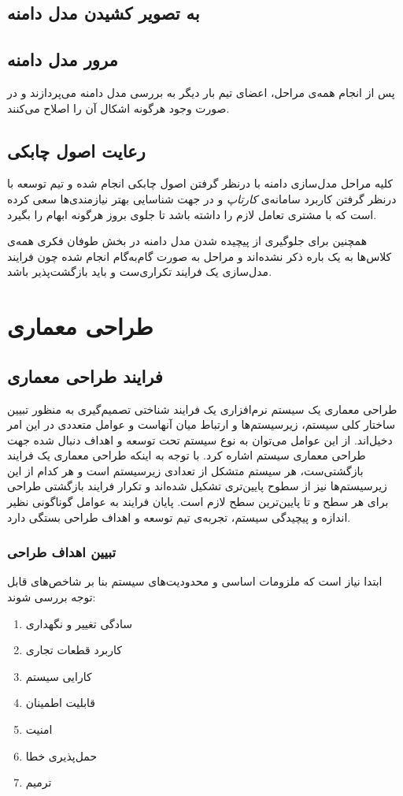 \section{به تصویر کشیدن مدل دامنه}


\section{مرور مدل دامنه}
پس از انجام همه‌ی مراحل، اعضای تیم بار دیگر به بررسی مدل دامنه می‌پردازند و در صورت وجود هرگونه اشکال آن را اصلاح می‌کنند.

\section{رعایت اصول چابکی}
کلیه مراحل مدل‌سازی دامنه با درنظر گرفتن اصول چابکی انجام شده و تیم توسعه با درنظر گرفتن کاربرد سامانه‌ی \textit{کارتاپ} و در جهت شناسایی بهتر نیازمندی‌ها سعی کرده است که با مشتری تعامل لازم را داشته باشد تا جلوی بروز هرگونه ابهام را بگیرد.

همچنین برای جلوگیری از پیچیده‌ شدن مدل دامنه در بخش طوفان فکری همه‌ی کلاس‌ها به یک باره ذکر نشده‌اند و مراحل به صورت گام‌به‌گام انجام شده چون فرایند مدل‌سازی یک فرایند تکراری‌ست و باید بازگشت‌پذیر باشد.

\chapter{طراحی معماری}

\section{فرایند طراحی معماری}	
طراحی معماری یک سیستم نرم‌افزاری یک فرایند شناختی تصمیم‌گیری به منظور تبیین ساختار کلی سیستم، زیرسیستم‌ها و ارتباط میان آنهاست و عوامل متعددی در این امر دخیل‌اند. از این عوامل می‌توان به نوع سیستم تحت توسعه و اهداف دنبال شده جهت طراحی معماری سیستم اشاره کرد. با توجه به اینکه طراحی معماری یک فرایند بازگشتی‌ست، هر سیستم متشکل از تعدادی زیرسیستم است و هر کدام از این زیرسیستم‌ها نیز از سطوح پایین‌تری تشکیل شده‌اند و تکرار فرایند بازگشتی طراحی برای هر سطح و تا پایین‌ترین سطح لازم است. پایان فرایند به عوامل گوناگونی نظیر اندازه و پیچیدگی سیستم، تجربه‌ی تیم توسعه و اهداف طراحی بستگی دارد.

\subsection{تبیین اهداف طراحی}			
ابتدا نیاز است که ملزومات اساسی و محدودیت‌های سیستم بنا بر شاخص‌های قابل توجه بررسی شوند:
\begin{enumerate}
	\item
	سادگی تغییر و نگهداری
	\item
	کاربرد قطعات تجاری
	\item
	کارایی سیستم
	\item
	قابلیت اطمینان
	\item
	امنیت
	\item
	حمل‌پذیری خطا
	\item
	ترمیم
\end{enumerate}

